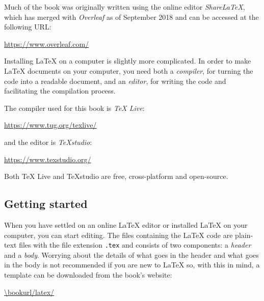 Much of the book was originally written using the online editor \textit{ShareLaTeX}, which has merged with \textit{Overleaf} as of September 2018 and can be accessed at the following URL:

\vspace{-15pt}
\begin{center}
\url{https://www.overleaf.com/}
\end{center}

\vspace{-15pt}
Installing \LaTeX{} on a computer is slightly more complicated. In order to make \LaTeX{} documents on your computer, you need both a \textit{compiler}, for turning the code into a readable document, and an \textit{editor}, for writing the code and facilitating the compilation process.

The compiler used for this book is \textit{TeX Live}:

\vspace{-15pt}
\begin{center}
\url{https://www.tug.org/texlive/}
\end{center}

\vspace{-15pt}
and the editor is \textit{TeXstudio}:

\vspace{-15pt}
\begin{center}
\url{https://www.texstudio.org/}
\end{center}

\vspace{-15pt}
Both TeX Live and TeXstudio are free, cross-platform and open-source.

\subsection*{Getting started}

When you have settled on an online \LaTeX{} editor or installed \LaTeX{} on your computer, you can start editing. The files containing the \LaTeX{} code are plain-text files with the file extension \texttt{.tex} and consists of two components: a \textit{header} and a \textit{body}. Worrying about the details of what goes in the header and what goes in the body is not recommended if you are new to \LaTeX{} so, with this in mind, a template can be downloaded from the book's website:

\vspace{-15pt}
\begin{center}
\url{\bookurl/latex/}
\end{center}

